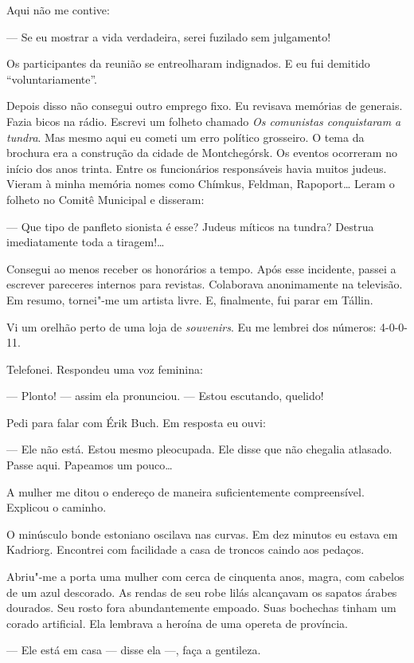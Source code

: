 Aqui não me contive:

--- Se eu mostrar a vida verdadeira, serei fuzilado sem julgamento!

Os participantes da reunião se entreolharam indignados. E eu fui
demitido ``voluntariamente''.

Depois disso não consegui outro emprego fixo. Eu revisava memórias de
generais. Fazia bicos na rádio. Escrevi um folheto chamado \emph{Os
comunistas conquistaram a tundra}. Mas mesmo aqui eu cometi um erro
político grosseiro. O tema da brochura era a construção da cidade de
Montchegórsk. Os eventos ocorreram no início dos anos trinta. Entre os
funcionários responsáveis havia muitos judeus. Vieram à minha memória
nomes como Chímkus, Feldman, Rapoport\ldots{} Leram o folheto no Comitê
Municipal e disseram:

--- Que tipo de panfleto sionista é esse? Judeus míticos na tundra?
Destrua imediatamente toda a tiragem!\ldots{}

Consegui ao menos receber os honorários a tempo. Após esse incidente,
passei a escrever pareceres internos para revistas. Colaborava
anonimamente na televisão. Em resumo, tornei"-me um artista livre. E,
finalmente, fui parar em Tállin.

Vi um orelhão perto de uma loja de \emph{souvenirs}. Eu me lembrei dos
números: 4-0-0-11.

Telefonei. Respondeu uma voz feminina:

--- Plonto! --- assim ela pronunciou. --- Estou escutando, quelido!

Pedi para falar com Érik Buch. Em resposta eu ouvi:

--- Ele não está. Estou mesmo pleocupada. Ele disse que não chegalia
atlasado. Passe aqui. Papeamos um pouco\ldots{}

A mulher me ditou o endereço de maneira suficientemente compreensível.
Explicou o caminho.

O minúsculo bonde estoniano oscilava nas curvas. Em dez minutos eu
estava em Kadriorg. Encontrei com facilidade a casa de troncos caindo
aos pedaços.

Abriu"-me a porta uma mulher com cerca de cinquenta anos, magra, com
cabelos de um azul descorado. As rendas de seu robe lilás alcançavam os
sapatos árabes dourados. Seu rosto fora abundantemente empoado. Suas
bochechas tinham um corado artificial. Ela lembrava a heroína de uma
opereta de província.

--- Ele está em casa --- disse ela ---, faça a gentileza.

